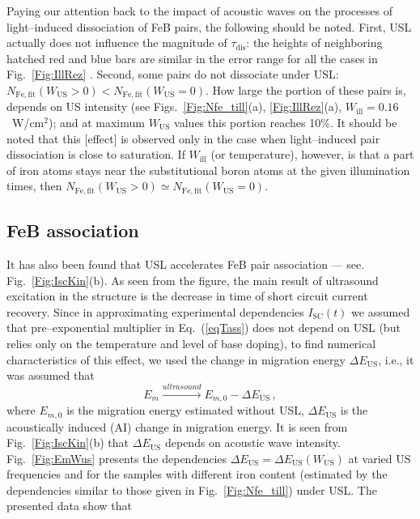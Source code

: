 \documentclass[%
 aip,jap,
 amsmath,amssymb,
 reprint,%
]{revtex4-1}
\begin{document}
Paying our attention back to the impact of acoustic waves on the processes of light--induced dissociation of FeB pairs, the following should be noted.
First,  USL actually does not influence the magnitude of $\tau_\mathrm{dis}$:
the heights of neighboring hatched red and blue bars are similar in the error range for all the cases in Fig.~\ref{Fig:IllRez} .
Second, some pairs do not dissociate under USL:
$N_\mathrm{Fe,fit}(W_\mathrm{US}>0)< N_\mathrm{Fe,fit}(W_\mathrm{US}=0)$.
How large the portion of these pairs is, depends on US intensity
(see Figs.~\ref{Fig:Nfe_till}(a), \ref{Fig:IllRez}(a), $W_\mathrm{ill}=0.16$~W/cm$^2$);
and at maximum $W_\mathrm{US}$ values this portion reaches 10\%.
It should be noted that this [effect] is observed only in the case when light--induced pair dissociation is close to saturation.
If $W_\mathrm{ill}$ (or temperature), however, is that a part of iron atoms stays near the substitutional boron atoms at the given illumination times,
then $N_\mathrm{Fe,fit}(W_\mathrm{US}>0)\simeq N_\mathrm{Fe,fit}(W_\mathrm{US}=0)$.


\subsection{\label{sec:FeBass}FeB association}

It has also been found that USL accelerates FeB pair association --–
see. Fig.~\ref{Fig:IscKin}(b).
As seen from the figure, the main result of ultrasound excitation in the structure
is the decrease in time of short circuit current recovery.
Since in approximating experimental dependencies $I_\mathrm{SC}(t)$ we assumed that pre--exponential multiplier in Eq.~(\ref{eqTass}) does not depend on USL
(but relies only on the temperature and level of base doping),
to find numerical characteristics of this effect,
we used the change in migration energy $\Delta E_\mathrm{US}$, i.e., it was assumed that
\begin{equation}
\label{eqEmUs}
E_m \xrightarrow{ultrasound} E_{m,0}-\Delta E_\mathrm{US}\,,
\end{equation}
where $E_{m,0}$ is the migration energy estimated without USL,
$\Delta E_\mathrm{US}$ is the acoustically induced (AI) change in migration energy.
It is seen from Fig.~\ref{Fig:IscKin}(b)
that $\Delta E_\mathrm{US}$ depends on acoustic wave intensity.
Fig.~\ref{Fig:EmWus} presents the dependencies $\Delta E_\mathrm{US}=\Delta E_\mathrm{US}(W_\mathrm{US})$ at varied US frequencies and for the samples with different iron content
(estimated by the dependencies similar to those given in Fig.~\ref{Fig:Nfe_till}) under USL.
The presented data show that
\end{document}
